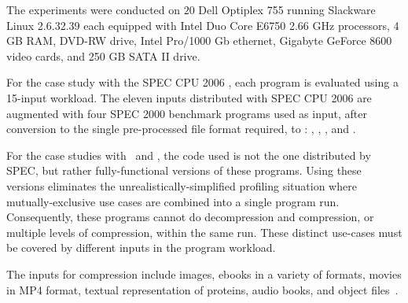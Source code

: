 
The experiments were conducted on $20$ Dell Optiplex 755 running Slackware Linux 2.6.32.39 each equipped with Intel Duo Core E6750 2.66 GHz processors, 4 GB RAM, DVD-RW drive, Intel Pro/1000 Gb ethernet, Gigabyte GeForce 8600 video cards, and 250 GB SATA II drive. 

For the case study with the SPEC CPU 2006  \gcc, each program is evaluated using a 15-input workload. The eleven inputs distributed with SPEC CPU 2006 are augmented with  four SPEC 2000 benchmark programs used as input, after conversion to the single pre-processed file format required, to \gcc: \bzip, \lbm, \mcf, and \parser.

For the case studies with \bzip\ and \gzip, the code used is not the one distributed by SPEC, but rather fully-functional versions of these programs. Using these versions eliminates the unrealistically-simplified profiling situation where mutually-exclusive use cases are combined into a single program run. Consequently, these programs cannot do decompression and compression, or multiple levels of compression, within the same run.  These distinct use-cases must be covered by different inputs in the program workload.

The inputs for compression include images, ebooks in a variety of formats, movies in MP4 format, textual representation of proteins, audio books, and object files~\cite{BerubePhD}.

